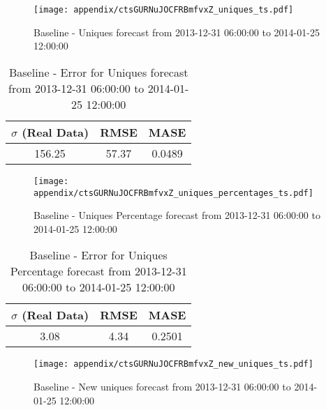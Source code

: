 \begin{figure}[H] \begin{center} \leavevmode
\texttt{[image: appendix/ctsGURNuJOCFRBmfvxZ\_uniques\_ts.pdf]} \caption[]{
Baseline - Uniques forecast from 2013-12-31 06:00:00 to 2014-01-25 12:00:00} \label{fig:appendix/ctsGURNuJOCFRBmfvxZ_uniques_ts.pdf} \end{center}
\end{figure}

\begin{table}[H]
\centering
\footnotesize
\begin{tabular}{ccc}
$\sigma$ (Real Data) & RMSE & MASE   \\ \hline
156.25 & 57.37 & 0.0489 \\
\end{tabular}

\vspace{0.5cm}

\caption[]{
Baseline - Error for Uniques forecast from 2013-12-31 06:00:00 to 2014-01-25 12:00:00}
\end{table}

\begin{figure}[H] \begin{center} \leavevmode
\texttt{[image: appendix/ctsGURNuJOCFRBmfvxZ\_uniques\_percentages\_ts.pdf]} \caption[]{
Baseline - Uniques Percentage forecast from 2013-12-31 06:00:00 to 2014-01-25 12:00:00} \label{fig:appendix/ctsGURNuJOCFRBmfvxZ_uniques_percentages_ts.pdf} \end{center}
\end{figure}

\begin{table}[H]
\centering
\footnotesize
\begin{tabular}{ccc}
$\sigma$ (Real Data) & RMSE & MASE   \\ \hline
3.08 & 4.34 & 0.2501 \\
\end{tabular}

\vspace{0.5cm}

\caption[]{
Baseline - Error for Uniques Percentage forecast from 2013-12-31 06:00:00 to 2014-01-25 12:00:00}
\end{table}

\begin{figure}[H] \begin{center} \leavevmode
\texttt{[image: appendix/ctsGURNuJOCFRBmfvxZ\_new\_uniques\_ts.pdf]} \caption[]{
Baseline - New uniques forecast from 2013-12-31 06:00:00 to 2014-01-25 12:00:00} \label{fig:appendix/ctsGURNuJOCFRBmfvxZ_new_uniques_ts.pdf} \end{center}
\end{figure}

